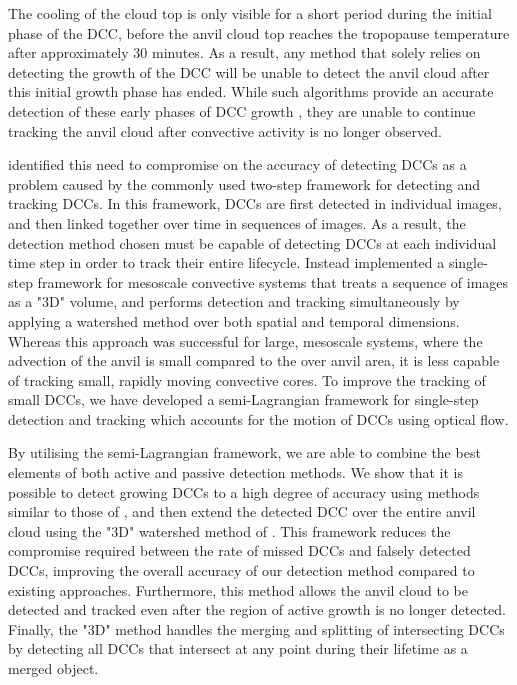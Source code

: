 \documentclass[amt, manuscript]{copernicus}
\begin{document}
The cooling of the cloud top is only visible for a short period during the initial phase of the DCC, before the anvil cloud top reaches the tropopause temperature after approximately 30 minutes.
As a result, any method that solely relies on detecting the growth of the DCC will be unable to detect the anvil cloud after this initial growth phase has ended.
While such algorithms provide an accurate detection of these early phases of DCC growth \citep{zinner_validation_2013}, they are unable to continue tracking the anvil cloud after convective activity is no longer observed.

\citet{fiolleau_algorithm_2013} identified this need to compromise on the accuracy of detecting DCCs as a problem caused by the commonly used two-step framework for detecting and tracking DCCs.
In this framework, DCCs are first detected in individual images, and then linked together over time in sequences of images.
As a result, the detection method chosen must be capable of detecting DCCs at each individual time step in order to track their entire lifecycle.
Instead \citet{fiolleau_algorithm_2013} implemented a single-step framework for mesoscale convective systems that treats a sequence of images as a "3D" volume, and performs detection and tracking simultaneously by applying a watershed method over both spatial and temporal dimensions.
Whereas this approach was successful for large, mesoscale systems, where the advection of the anvil is small compared to the over anvil area, it is less capable of tracking small, rapidly moving convective cores.
To improve the tracking of small DCCs, we have developed a semi-Lagrangian framework for single-step detection and tracking which accounts for the motion of DCCs using optical flow.

By utilising the semi-Lagrangian framework, we are able to combine the best elements of both active and passive detection methods.
We show that it is possible to detect growing DCCs to a high degree of accuracy using methods similar to those of \citet{zinner_cb-tram:_2008}, and then extend the detected DCC over the entire anvil cloud using the "3D" watershed method of \citet{fiolleau_algorithm_2013}.
This framework reduces the compromise required between the rate of missed DCCs and falsely detected DCCs, improving the overall accuracy of our detection method compared to existing approaches.
Furthermore, this method allows the anvil cloud to be detected and tracked even after the region of active growth is no longer detected.
Finally, the "3D" method handles the merging and splitting of intersecting DCCs by detecting all DCCs that intersect at any point during their lifetime as a merged object.
\end{document}
